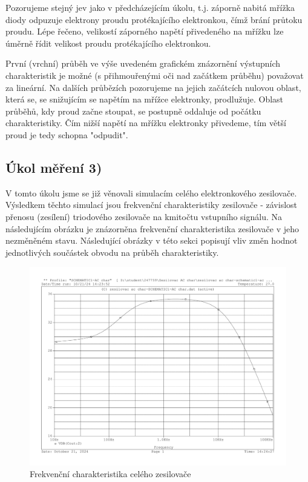 \documentclass[a4paper, czech]{article}
\begin{document}
Pozorujeme stejný jev jako v předcházejícím úkolu, t.j. záporně nabitá mřížka diody odpuzuje elektrony proudu protékajícího elektronkou, čímž brání průtoku proudu.
Lépe řečeno, velikostí záporného napětí přivedeného na mřížku lze úměrně řídit velikost proudu protékajícího elektronkou.

První (vrchní) průběh ve výše uvedeném grafickém znázornění výstupních charakteristik je možné (s přihmouřenými oči nad začátkem průběhu) považovat za lineární.
Na dalších průbězích pozorujeme na jejich začátcích nulovou oblast, která se, se snižujícím se napětím na mřížce elektronky, prodlužuje.
Oblast průběhů, kdy proud začne stoupat, se postupně oddaluje od počátku charakteristiky.
Čím nižší napětí na mřížku elektronky přivedeme, tím větší proud je tedy schopna "odpudit".

\pagebreak

\subsection{Úkol měření 3)}

V tomto úkolu jsme se již věnovali simulacím celého elektronkového zesilovače.
Výsledkem těchto simulací jsou frekvenční charakteristiky zesilovače - závislost přenosu (zesílení) triodového zesilovače na kmitočtu vstupního signálu. 
Na následujícím obrázku je znázorněna frekvenční charakteristika zesilovače v jeho nezměněném stavu.
Následující obrázky v této sekci popisují vliv změn hodnot jednotlivých součástek obvodu na průběh charakteristiky. 

\begin{figure}[H]
    \centering
    \includegraphics[width=\textwidth]{charakteristiky/uloha3.pdf}
    \caption{Frekvenční charakteristika celého zesilovače}
\end{figure}
\end{document}
